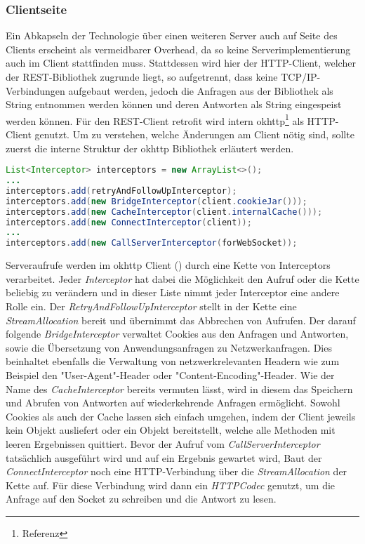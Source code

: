         \subsubsection{Clientseite}
        Ein Abkapseln der Technologie über einen weiteren Server auch auf Seite des Clients erscheint als vermeidbarer Overhead, da so keine Serverimplementierung auch im Client stattfinden muss. Stattdessen wird hier der HTTP-Client, welcher der REST-Bibliothek zugrunde liegt, so aufgetrennt, dass keine TCP/IP-Verbindungen aufgebaut werden, jedoch die Anfragen aus der Bibliothek als String entnommen werden können und  deren Antworten als String eingespeist werden können. Für den REST-Client retrofit wird intern okhttp\footnote{Referenz} als HTTP-Client genutzt. Um zu verstehen, welche Änderungen am Client nötig sind, sollte zuerst die interne Struktur der okhttp Bibliothek erläutert werden.
        \begin{lstlisting}[frame=bt, label={lst:android:okhttp}, language=Java, caption=Interner Aufbau von okhttp (Clientcode in Java) \cite{okhttpRealCall}]
List<Interceptor> interceptors = new ArrayList<>();
...
interceptors.add(retryAndFollowUpInterceptor);
interceptors.add(new BridgeInterceptor(client.cookieJar()));
interceptors.add(new CacheInterceptor(client.internalCache()));
interceptors.add(new ConnectInterceptor(client));
...
interceptors.add(new CallServerInterceptor(forWebSocket));
        \end{lstlisting}
        Serveraufrufe werden im okhttp Client () durch eine Kette von Interceptors verarbeitet. Jeder {\it Interceptor} hat dabei die Möglichkeit den Aufruf oder die Kette beliebig zu verändern und in dieser Liste nimmt jeder Interceptor eine andere Rolle ein. Der {\it RetryAndFollowUpInterceptor} stellt in der Kette eine {\it StreamAllocation} bereit und übernimmt das Abbrechen von Aufrufen. Der darauf folgende {\it BridgeInterceptor} verwaltet Cookies aus den Anfragen und Antworten, sowie die Übersetzung von Anwendungsanfragen zu Netzwerkanfragen. Dies beinhaltet ebenfalls die Verwaltung von netzwerkrelevanten Headern wie zum Beispiel den "User-Agent"-Header oder "Content-Encoding"-Header. Wie der Name des {\it CacheInterceptor} bereits vermuten lässt, wird in diesem das Speichern und Abrufen von Antworten auf wiederkehrende Anfragen ermöglicht. Sowohl Cookies als auch der Cache lassen sich einfach umgehen, indem der Client jeweils kein Objekt ausliefert oder ein Objekt bereitstellt, welche alle Methoden mit leeren Ergebnissen quittiert. Bevor der Aufruf vom {\it CallServerInterceptor} tatsächlich ausgeführt wird und auf ein Ergebnis gewartet wird, Baut der {\it ConnectInterceptor} noch eine HTTP-Verbindung über die {\it StreamAllocation} der Kette auf. Für diese Verbindung wird dann ein {\it HTTPCodec} genutzt, um die Anfrage auf den Socket zu schreiben und die Antwort zu lesen.
